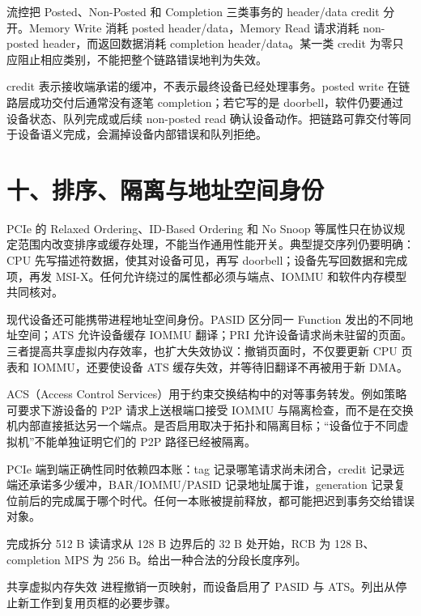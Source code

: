 
流控把 Posted、Non-Posted 和 Completion 三类事务的 header/data credit 分开。Memory Write 消耗 posted header/data，Memory Read 请求消耗 non-posted header，而返回数据消耗 completion header/data。某一类 credit 为零只应阻止相应类别，不能把整个链路错误地判为失效。

credit 表示接收端承诺的缓冲，不表示最终设备已经处理事务。posted write 在链路层成功交付后通常没有逐笔 completion；若它写的是 doorbell，软件仍要通过设备状态、队列完成或后续 non-posted read 确认设备动作。把链路可靠交付等同于设备语义完成，会漏掉设备内部错误和队列拒绝。

\section{十、排序、隔离与地址空间身份}

PCIe 的 Relaxed Ordering、ID-Based Ordering 和 No Snoop 等属性只在协议规定范围内改变排序或缓存处理，不能当作通用性能开关。典型提交序列仍要明确：CPU 先写描述符数据，使其对设备可见，再写 doorbell；设备先写回数据和完成项，再发 MSI-X。任何允许绕过的属性都必须与端点、IOMMU 和软件内存模型共同核对。

现代设备还可能携带进程地址空间身份。PASID 区分同一 Function 发出的不同地址空间；ATS 允许设备缓存 IOMMU 翻译；PRI 允许设备请求尚未驻留的页面。三者提高共享虚拟内存效率，也扩大失效协议：撤销页面时，不仅要更新 CPU 页表和 IOMMU，还要使设备 ATS 缓存失效，并等待旧翻译不再被用于新 DMA。

ACS（Access Control Services）用于约束交换结构中的对等事务转发。例如策略可要求下游设备的 P2P 请求上送根端口接受 IOMMU 与隔离检查，而不是在交换机内部直接抵达另一个端点。是否启用取决于拓扑和隔离目标；“设备位于不同虚拟机”不能单独证明它们的 P2P 路径已经被隔离。

\begin{keyidea}
PCIe 端到端正确性同时依赖四本账：tag 记录哪笔请求尚未闭合，credit 记录远端还承诺多少缓冲，BAR/IOMMU/PASID 记录地址属于谁，generation 记录复位前后的完成属于哪个时代。任何一本账被提前释放，都可能把迟到事务交给错误对象。
\end{keyidea}

\begin{chapterexercise}{完成拆分}
512 B 读请求从 128 B 边界后的 32 B 处开始，RCB 为 128 B、completion MPS 为 256 B。给出一种合法的分段长度序列。
\end{chapterexercise}

\begin{chapterexercise}{共享虚拟内存失效}
进程撤销一页映射，而设备启用了 PASID 与 ATS。列出从停止新工作到复用页框的必要步骤。
\end{chapterexercise}

